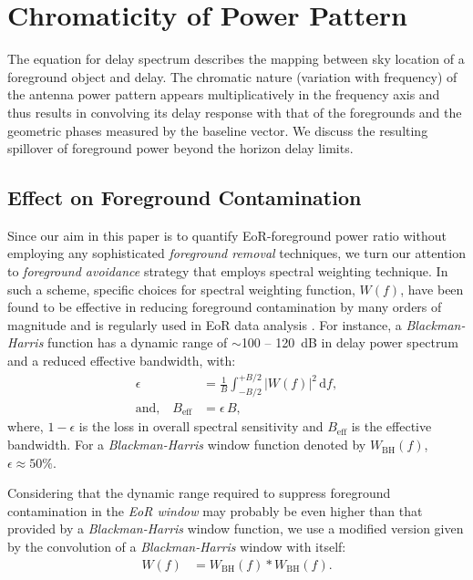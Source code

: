 \documentclass[preprint2,iop,numberedappendix,twocolappendix,appendixfloats]{emulateapj}
\newcommand{\dif}{\mathrm{d}}
\begin{document}
\section{Chromaticity of Power Pattern}\label{sec:beam-chromaticity}

The equation for delay spectrum describes the mapping between sky location of a foreground object and delay. The chromatic nature (variation with frequency) of the antenna power pattern appears multiplicatively in the frequency axis and thus results in convolving its delay response with that of the foregrounds and the geometric phases measured by the baseline vector. We discuss the resulting spillover of foreground power beyond the horizon delay limits.

\subsection{Effect on Foreground Contamination}\label{sec:effects-fgdps}

Since our aim in this paper is to quantify EoR-foreground power ratio without employing any sophisticated {\it foreground removal} techniques, we turn our attention to {\it foreground avoidance} strategy that employs spectral weighting technique. In such a scheme, specific choices for spectral weighting function, $W(f)$, have been found to be effective in reducing foreground contamination by many orders of magnitude \citep{thy13} and is regularly used in EoR data analysis \citep{par12a}. For instance, a {\it Blackman-Harris} function \citep{har78} has a dynamic range of $\sim$100 -- 120~dB in delay power spectrum and a reduced effective bandwidth, with:
\begin{align}\label{eqn:Beff}
  \epsilon &= \frac{1}{B} \int_{-B/2}^{+B/2} |W(f)|^2\,\dif f, \\
  \textrm{and,}\quad B_\textrm{eff} &= \epsilon\,B,
\end{align}
where, $1-\epsilon$ is the loss in overall spectral sensitivity and $B_\textrm{eff}$ is the effective bandwidth. For a {\it Blackman-Harris} window function denoted by $W_\textrm{BH}(f)$, $\epsilon \approx 50\%$. %

Considering that the dynamic range required to suppress foreground contamination in the {\it EoR window} may probably be even higher than that provided by a {\it Blackman-Harris} window function, we use a modified version given by the convolution of a {\it Blackman-Harris} window with itself:
\begin{align}\label{eqn:bhw2}
  W(f) &= W_\textrm{BH}(f) \ast W_\textrm{BH}(f).
\end{align}
\end{document}
